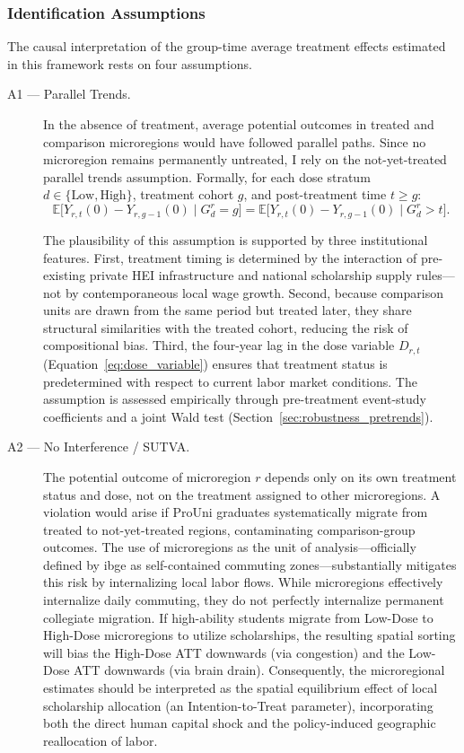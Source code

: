 \subsubsection{Identification Assumptions}
\label{sec:assumptions}

The causal interpretation of the group-time average treatment effects estimated in this framework rests on four assumptions.

\begin{description}

\item[A1 --- Parallel Trends.]
In the absence of treatment, average potential outcomes in treated and comparison microregions would have followed parallel paths. Since no microregion remains permanently untreated, I rely on the not-yet-treated parallel trends assumption. Formally, for each dose stratum $d \in \{\text{Low}, \text{High}\}$, treatment cohort $g$, and post-treatment time $t \geq g$:
\begin{equation}
    \mathbb{E}\bigl[Y_{r,t}(0) - Y_{r,g-1}(0) \mid G_d^r = g\bigr]
    =
    \mathbb{E}\bigl[Y_{r,t}(0) - Y_{r,g-1}(0) \mid G_d^r > t\bigr].
    \label{eq:pt}
\end{equation}

The plausibility of this assumption is supported by three institutional features. First, treatment timing is determined by the interaction of pre-existing private HEI infrastructure and national scholarship supply rules---not by contemporaneous local wage growth. Second, because comparison units are drawn from the same period but treated later, they share structural similarities with the treated cohort, reducing the risk of compositional bias. Third, the four-year lag in the dose variable $D_{r,t}$ (Equation~\ref{eq:dose_variable}) ensures that treatment status is predetermined with respect to current labor market conditions. The assumption is assessed empirically through pre-treatment event-study coefficients and a joint Wald test (Section~\ref{sec:robustness_pretrends}).

\item[A2 --- No Interference / SUTVA.]
The potential outcome of microregion $r$ depends only on its own treatment status and dose, not on the treatment assigned to other microregions. A violation would arise if ProUni graduates systematically migrate from treated to not-yet-treated regions, contaminating comparison-group outcomes. The use of microregions as the unit of analysis---officially defined by \acrshort{ibge} as self-contained commuting zones---substantially mitigates this risk by internalizing local labor flows. While microregions effectively internalize daily commuting, they do not perfectly internalize permanent collegiate migration. If high-ability students migrate from Low-Dose to High-Dose microregions to utilize scholarships, the resulting spatial sorting will bias the High-Dose ATT downwards (via congestion) and the Low-Dose ATT downwards (via brain drain). Consequently, the microregional estimates should be interpreted as the spatial equilibrium effect of local scholarship allocation (an Intention-to-Treat parameter), incorporating both the direct human capital shock and the policy-induced geographic reallocation of labor.


\end{description}

